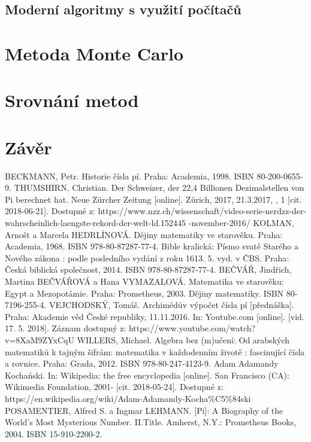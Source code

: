 \documentclass[rocnikovka]{gzwroc} %
\begin{document}
\subsection{Moderní algoritmy s využití počítačů}
\section{Metoda Monte Carlo}
\section{Srovnání metod}
\section{Závěr}
\newpage
\begin{oldthebibliography}{99}
BECKMANN, Petr. Historie čísla pí. Praha: Academia, 1998. ISBN 80-200-0655-9.
THUMSHIRN, Christian. Der Schweizer, der 22,4 Billionen Dezimalstellen von Pi berechnet hat. Neue Zürcher Zeitung [online]. Zürich, 2017, 21.3.2017, , 1 [cit. 2018-06-21]. Dostupné z: https://www.nzz.ch/wissenschaft/video-serie-nerdzz-der-wahrscheinlich-laengste-rekord-der-welt-ld.152445
-november-2016/
KOLMAN, Arnošt a Marcela HEDRLÍNOVÁ. Dějiny matematiky ve starověku. Praha: Academia, 1968. ISBN 978-80-87287-77-4.
Bible kralická: Písmo svaté Starého a Nového zákona : podle posledního vydání z roku 1613. 5. vyd. v ČBS. Praha: Česká biblická společnost, 2014. ISBN 978-80-87287-77-4.
BEČVÁŘ, Jindřich, Martina BEČVÁŘOVÁ a Hana VYMAZALOVÁ. Matematika ve starověku: Egypt a Mezopotámie. Praha: Prometheus, 2003. Dějiny matematiky. ISBN 80-7196-255-4.
VEJCHODSKÝ, Tomáš. Archimédův výpočet čísla pí [přednáška]. Praha: Akademie věd České republiky, 11.11.2016. In: Youtube.com [online]. [vid. 17. 5. 2018]. Záznam dostupný z: https://www.youtube.com/watch?v=8XaM9ZYxCqU
WILLERS, Michael. Algebra bez (m)učení: Od arabských matematiků k tajným šifrám: matematika v každodenním životě : fascinující čísla a rovnice. Praha: Grada, 2012. ISBN 978-80-247-4123-9.
Adam Adamandy Kochański. In: Wikipedia: the free encyclopedia [online]. San Francisco (CA): Wikimedia Foundation, 2001- [cit. 2018-05-24]. Dostupné z: https://en.wikipedia.org/wiki/Adam-Adamandy-Kocha\%C5\%84ski
POSAMENTIER, Alfred S. a Ingmar LEHMANN. [Pi]: A Biography of the World's Most Mysterious Number. II.Title. Amherst, N.Y.: Prometheus Books, 2004. ISBN 15-910-2200-2.

\end{oldthebibliography}
\end{document}
